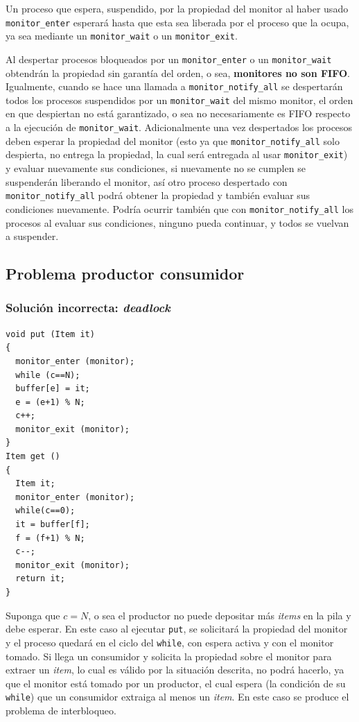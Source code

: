 Un proceso que espera, suspendido, por la propiedad del monitor al haber usado
\texttt{monitor\_enter} esperará hasta que esta sea liberada por el proceso que
la ocupa, ya sea mediante un \texttt{monitor\_wait} o un \texttt{monitor\_exit}.

Al despertar procesos bloqueados por un \texttt{monitor\_enter} o un
\texttt{monitor\_wait} obtendrán la propiedad sin garantía del orden, o sea,
\textbf{monitores no son FIFO}. Igualmente, cuando se hace una llamada a
\texttt{monitor\_notify\_all} se despertarán todos los procesos suspendidos
por un \texttt{monitor\_wait} del mismo monitor, el orden en que despiertan no
está garantizado, o sea no necesariamente es FIFO respecto a la ejecución de
\texttt{monitor\_wait}. Adicionalmente una vez despertados los procesos deben
esperar la propiedad del monitor (esto ya que \texttt{monitor\_notify\_all}
solo despierta, no entrega la propiedad, la cual será entregada al usar
\texttt{monitor\_exit}) y evaluar nuevamente sus condiciones, si nuevamente no
se cumplen se suspenderán liberando el monitor, así otro proceso despertado con
\texttt{monitor\_notify\_all} podrá obtener la propiedad y también evaluar sus
condiciones nuevamente. Podría ocurrir también que con
\texttt{monitor\_notify\_all} los procesos al evaluar sus condiciones, ninguno
pueda continuar, y todos se vuelvan a suspender.

\subsection{Problema productor consumidor}

\subsubsection{Solución incorrecta: \emph{deadlock}}
\begin{lstlisting}
void put (Item it)
{
  monitor_enter (monitor);
  while (c==N);
  buffer[e] = it;
  e = (e+1) % N;
  c++;
  monitor_exit (monitor);
}
Item get ()
{
  Item it;
  monitor_enter (monitor);
  while(c==0);
  it = buffer[f];
  f = (f+1) % N;
  c--;
  monitor_exit (monitor);
  return it;
}
\end{lstlisting}

Suponga que $c=N$, o sea el productor no puede depositar más \emph{items} en
la pila y debe esperar. En este caso al ejecutar \texttt{put}, se solicitará la
propiedad del monitor y el proceso quedará en el ciclo del \texttt{while}, con
espera activa y con el monitor tomado. Si llega un consumidor y solicita la
propiedad sobre el monitor para extraer un \emph{item}, lo cual es válido por
la situación descrita, no podrá hacerlo, ya que el monitor está tomado por un
productor, el cual espera (la condición de su \texttt{while}) que un consumidor
extraiga al menos un \emph{item}. En este caso se produce el problema de
interbloqueo.

